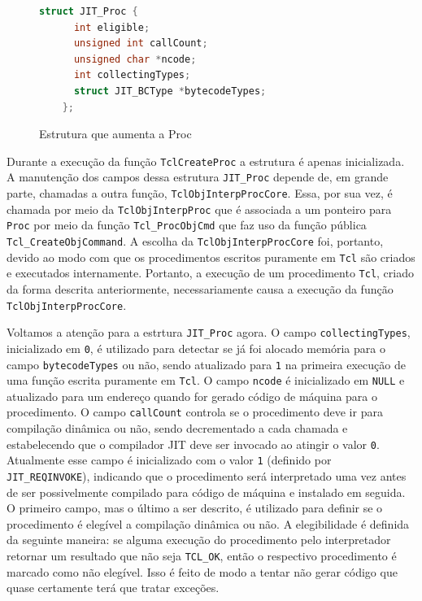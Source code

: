 \begin{figure}[h]
  \centering
  \begin{lstlisting}[language=C]
    struct JIT_Proc {
      int eligible;
      unsigned int callCount;
      unsigned char *ncode;
      int collectingTypes;
      struct JIT_BCType *bytecodeTypes;
    };
  \end{lstlisting}
  \caption{\label{jitproc}Estrutura que aumenta a Proc}
\end{figure}

Durante a execução da função \verb!TclCreateProc! a estrutura é apenas
inicializada. A manutenção dos campos dessa estrutura \verb!JIT_Proc!
depende de, em grande parte, chamadas a outra função,
\verb!TclObjInterpProcCore!. Essa,
por sua vez, é chamada por meio da \verb!TclObjInterpProc! que é associada
a um ponteiro para \verb!Proc! por meio da função \verb!Tcl_ProcObjCmd! que
faz uso da função pública \verb!Tcl_CreateObjCommand!. A escolha da
\verb!TclObjInterpProcCore! foi, portanto, devido ao modo com que os
procedimentos escritos puramente em \texttt{Tcl} são criados
e executados internamente.
Portanto, a execução de um procedimento \texttt{Tcl},
criado da forma descrita anteriormente, necessariamente causa a
execução da função \verb!TclObjInterpProcCore!.

Voltamos a atenção para a estrtura \verb!JIT_Proc! agora.
O campo \verb!collectingTypes!, inicializado em \verb!0!, é utilizado para
detectar se já foi alocado memória para o campo \verb!bytecodeTypes!
ou não, sendo atualizado para \verb!1! na primeira execução de uma
função escrita puramente em \texttt{Tcl}. O campo \verb!ncode! é
inicializado em \verb!NULL! e atualizado para um endereço quando for
gerado código de máquina para o procedimento. O campo \verb!callCount!
controla se o procedimento deve ir para compilação dinâmica ou não,
sendo decrementado a cada chamada e estabelecendo que o compilador JIT
deve ser invocado ao atingir
o valor \verb!0!. Atualmente esse campo é inicializado com o valor
\verb!1! (definido por \verb!JIT_REQINVOKE!),
indicando que o procedimento será interpretado uma vez antes
de ser possivelmente compilado para código de máquina e instalado em
seguida. O primeiro
campo, mas o último a ser descrito, é utilizado para definir se o
procedimento é elegível a compilação dinâmica ou não. A elegibilidade
é definida da seguinte maneira: se alguma execução do procedimento pelo
interpretador retornar um resultado que não seja \verb!TCL_OK!, então
o respectivo procedimento é marcado como não elegível. Isso é feito de
modo a tentar não gerar código que quase certamente terá que
tratar exceções.

